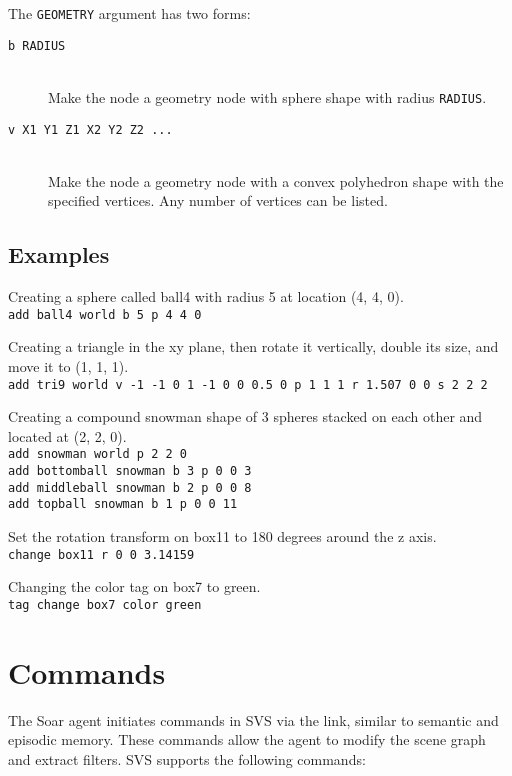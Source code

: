 The \texttt{GEOMETRY} argument has two forms:

\begin{description}

\item[\texttt{b RADIUS}] \hfill \\
Make the node a geometry node with sphere shape with radius \texttt{RADIUS}.

\item[\texttt{v X1 Y1 Z1 X2 Y2 Z2 ...}] \hfill \\
Make the node a geometry node with a convex polyhedron shape with the specified vertices.
Any number of vertices can be listed.

\end{description}

\subsection{Examples}

Creating a sphere called ball4 with radius 5 at location (4, 4, 0). \\
\texttt{add ball4 world b 5 p 4 4 0}

Creating a triangle in the xy plane, then rotate it vertically, double its size, and move it to (1, 1, 1).  \\
\texttt{add tri9 world v -1 -1 0 1 -1 0 0 0.5 0 p 1 1 1 r 1.507 0 0 s 2 2 2}

Creating a compound snowman shape of 3 spheres stacked on each other and located at (2, 2, 0). \\
\texttt{add snowman world p 2 2 0} \\
\texttt{add bottomball snowman b 3 p 0 0 3} \\
\texttt{add middleball snowman b 2 p 0 0 8} \\
\texttt{add topball snowman b 1 p 0 0 11} 

Set the rotation transform on box11 to 180 degrees around the z axis. \\
\texttt{change box11 r 0 0 3.14159}

Changing the color tag on box7 to green. \\
\texttt{tag change box7 color green}


\section{Commands}

The Soar agent initiates commands in SVS via the  link, 
similar to semantic and episodic memory. These commands allow the agent to 
modify the scene graph and extract filters. 
SVS supports the following commands:

